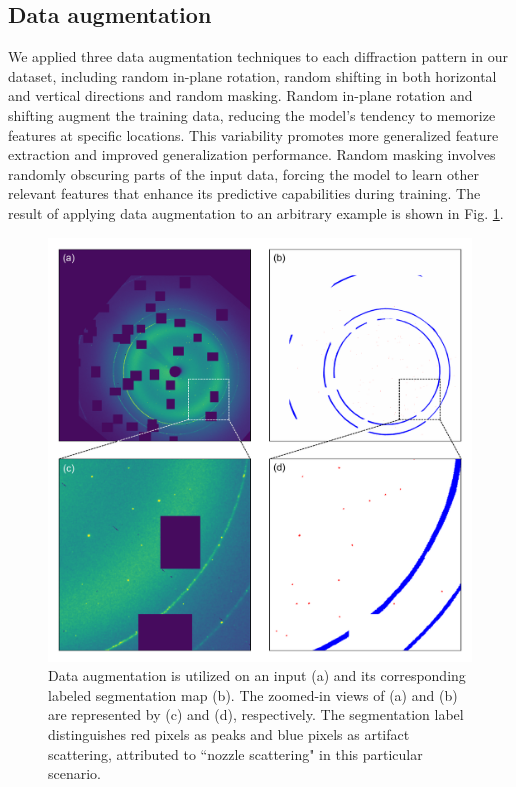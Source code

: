 \documentclass[a4paper]{article}
\begin{document}
\subsection{Data augmentation}

We applied three data augmentation techniques to each diffraction pattern in our
dataset, including random in-plane rotation, random shifting in both horizontal
and vertical directions and random masking.  Random in-plane rotation and
shifting augment the training data, reducing the model's tendency to memorize
features at specific locations.  This variability promotes more generalized
feature extraction and improved generalization performance.  Random masking
involves randomly obscuring parts of the input data, forcing the model to learn
other relevant features that enhance its predictive capabilities during
training.  The result of applying data augmentation to an arbitrary example is
shown in Fig. \ref{fig : data aug}.

\begin{figure}[!ht]
\includegraphics[width=\textwidth,keepaspectratio]
{./figures/data_aug.pdf}
\caption{Data augmentation is utilized on an input (a) and its corresponding
labeled segmentation map (b). The zoomed-in views of (a) and (b) are represented
by (c) and (d), respectively. The segmentation label distinguishes red pixels as
peaks and blue pixels as artifact scattering, attributed to ``nozzle scattering"
in this particular scenario.}
\label{fig : data aug}
\end{figure}
\end{document}

